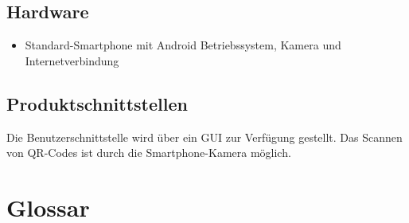 \documentclass[parskip=full]{scrartcl}
\begin{document}
\subsection{Hardware}
\begin{itemize}
    \item Standard-Smartphone mit Android Betriebssystem, Kamera und Internetverbindung
\end{itemize}

\subsection{Produktschnittstellen}
Die Benutzerschnittstelle wird über ein GUI zur Verfügung gestellt.
Das Scannen von QR-Codes ist durch die Smartphone-Kamera möglich.
\newpage

\section{Glossar}
\printglossary[type=\acronymtype]
\end{document}
